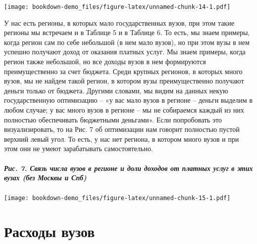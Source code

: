 \documentclass[]{book}
\let\oldparagraph\paragraph
\renewcommand{\paragraph}[1]{\oldparagraph{#1}\mbox{}}
\begin{document}
\texttt{[image: bookdown-demo\_files/figure-latex/unnamed-chunk-14-1.pdf]}

У нас есть регионы, в которых мало государственных вузов, при этом такие регионы мы встречаем и в Таблице 5 и в Таблице 6. То есть, мы знаем примеры, когда регион сам по себе небольшой (в нем мало вузов), но при этом вузы в нем успешно получают доход от оказания платных услуг. Мы знаем примеры, когда регион также небольшой, но все доходы вузов в нем формируются преимущественно за счет бюджета. Среди крупных регионов, в которых много вузов, мы не найдем такой регион, в котором вузы преимущественно получают деньги только от бюджета. Другими словами, мы видим на данных некую государственную оптимизацию -- «у вас мало вузов в регионе -- деньги выделим в любом случае; у вас много вузов в регионе -- мы не собираемся каждый из них полностью обеспечивать бюджетными деньгами». Если попробовать это визуализировать, то на Рис. 7 об оптимизации нам говорит полностью пустой верхний левый угол. То есть, у нас нет региона, в котором много вузов и при этом они не умеют зарабатывать самостоятельно.

\hypertarget{ux440ux438ux441.-7.-ux441ux432ux44fux437ux44c-ux447ux438ux441ux43bux430-ux432ux443ux437ux43eux432-ux432-ux440ux435ux433ux438ux43eux43dux435-ux438-ux434ux43eux43bux438-ux434ux43eux445ux43eux434ux43eux432-ux43eux442-ux43fux43bux430ux442ux43dux44bux445-ux443ux441ux43bux443ux433-ux432-ux44dux442ux438ux445-ux432ux443ux437ux430ux445-ux431ux435ux437-ux43cux43eux441ux43aux432ux44b-ux438-ux441ux43fux431}{%
\paragraph{Рис. 7. Связь числа вузов в регионе и доли доходов от платных услуг в этих вузах (без Москвы и Спб)}\label{ux440ux438ux441.-7.-ux441ux432ux44fux437ux44c-ux447ux438ux441ux43bux430-ux432ux443ux437ux43eux432-ux432-ux440ux435ux433ux438ux43eux43dux435-ux438-ux434ux43eux43bux438-ux434ux43eux445ux43eux434ux43eux432-ux43eux442-ux43fux43bux430ux442ux43dux44bux445-ux443ux441ux43bux443ux433-ux432-ux44dux442ux438ux445-ux432ux443ux437ux430ux445-ux431ux435ux437-ux43cux43eux441ux43aux432ux44b-ux438-ux441ux43fux431}}

\texttt{[image: bookdown-demo\_files/figure-latex/unnamed-chunk-15-1.pdf]}

\hypertarget{ux440ux430ux441ux445ux43eux434ux44b-ux432ux443ux437ux43eux432}{%
\chapter{Расходы вузов}\label{ux440ux430ux441ux445ux43eux434ux44b-ux432ux443ux437ux43eux432}}
\end{document}
